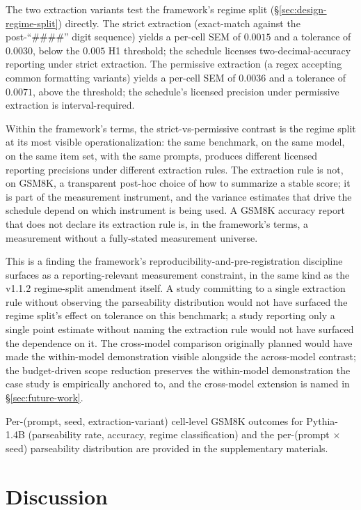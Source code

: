 \documentclass[11pt]{article}
\begin{document}
The two extraction variants test the framework's regime split (§\ref{sec:design-regime-split}) directly. The strict extraction (exact-match against the post-``\#\#\#\#'' digit sequence) yields a per-cell SEM of $0.0015$ and a tolerance of $0.0030$, below the $0.005$ H1 threshold; the schedule licenses two-decimal-accuracy reporting under strict extraction. The permissive extraction (a regex accepting common formatting variants) yields a per-cell SEM of $0.0036$ and a tolerance of $0.0071$, above the threshold; the schedule's licensed precision under permissive extraction is interval-required.

Within the framework's terms, the strict-vs-permissive contrast is the regime split at its most visible operationalization: the same benchmark, on the same model, on the same item set, with the same prompts, produces different licensed reporting precisions under different extraction rules. The extraction rule is not, on GSM8K, a transparent post-hoc choice of how to summarize a stable score; it is part of the measurement instrument, and the variance estimates that drive the schedule depend on which instrument is being used. A GSM8K accuracy report that does not declare its extraction rule is, in the framework's terms, a measurement without a fully-stated measurement universe.

This is a finding the framework's reproducibility-and-pre-registration discipline surfaces as a reporting-relevant measurement constraint, in the same kind as the v1.1.2 regime-split amendment itself. A study committing to a single extraction rule without observing the parseability distribution would not have surfaced the regime split's effect on tolerance on this benchmark; a study reporting only a single point estimate without naming the extraction rule would not have surfaced the dependence on it. The cross-model comparison originally planned would have made the within-model demonstration visible alongside the across-model contrast; the budget-driven scope reduction preserves the within-model demonstration the case study is empirically anchored to, and the cross-model extension is named in §\ref{sec:future-work}.

Per-(prompt, seed, extraction-variant) cell-level GSM8K outcomes for Pythia-1.4B (parseability rate, accuracy, regime classification) and the per-(prompt $\times$ seed) parseability distribution are provided in the supplementary materials.

\section{Discussion}
\label{sec:discussion}
\end{document}
